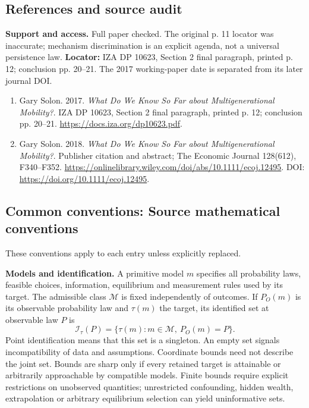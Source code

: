 \documentclass[11pt,a4paper]{article}
\begin{document}
\subsection*{References and source audit}
\textbf{Support and access.} Full paper checked. The original p. 11 locator was inaccurate; mechanism discrimination is an explicit agenda, not a universal persistence law. \textbf{Locator:} IZA DP 10623, Section 2 final paragraph, printed p. 12; conclusion pp. 20--21. The 2017 working-paper date is separated from its later journal DOI.
\begin{enumerate}\raggedright
\item\hypertarget{definitions:source:30007646:1}{} Gary Solon. 2017. \emph{What Do We Know So Far about Multigenerational Mobility?}. IZA DP 10623, Section 2 final paragraph, printed p. 12; conclusion pp. 20--21.
\url{https://docs.iza.org/dp10623.pdf}.
\item\hypertarget{definitions:source:30007646:2}{} Gary Solon. 2018. \emph{What Do We Know So Far about Multigenerational Mobility?}. Publisher citation and abstract; The Economic Journal 128(612), F340--F352.
\url{https://onlinelibrary.wiley.com/doi/abs/10.1111/ecoj.12495}.
DOI: \url{https://doi.org/10.1111/ecoj.12495}.
\end{enumerate}

\subsection*{Common conventions: Source mathematical conventions}

These conventions apply to each entry unless explicitly replaced.

\textbf{Models and identification.} A primitive model \(m\) specifies all probability laws, feasible choices, information, equilibrium and measurement rules used by its target. The admissible class \(\mathcal M\) is fixed independently of outcomes. If \(P_O(m)\) is its observable probability law and \(\tau(m)\) the target, its identified set at observable law \(P\) is
\[
 \mathcal I_\tau(P)=\{\tau(m):m\in\mathcal M,\ P_O(m)=P\}.
\]
Point identification means that this set is a singleton. An empty set signals incompatibility of data and assumptions. Coordinate bounds need not describe the joint set. Bounds are sharp only if every retained target is attainable or arbitrarily approachable by compatible models. Finite bounds require explicit restrictions on unobserved quantities; unrestricted confounding, hidden wealth, extrapolation or arbitrary equilibrium selection can yield uninformative sets.
\end{document}
